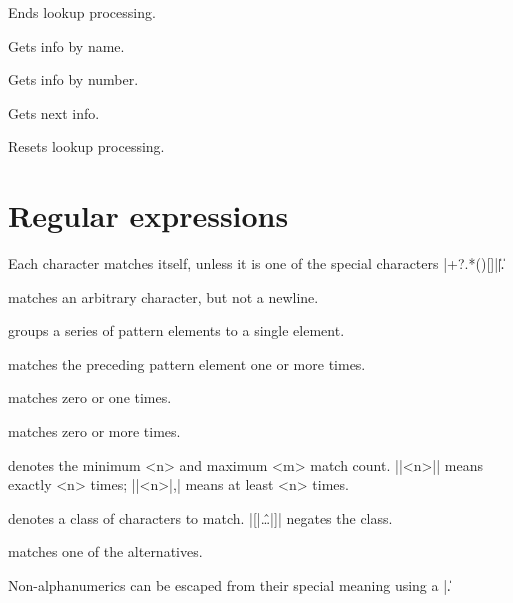 \begin{enum}{6cm}

	Ends lookup processing.

	Gets info by name.

	Gets info by number.

	Gets next info.

	Resets lookup processing.

\end{enum}
\section{Regular expressions} 

Each character matches itself, unless it is one of the special
characters |+?.*()[]{}|\||\|.

\begin{enum}{1cm}

matches an arbitrary character, but not a newline.

\Xj{|(|\ldots|)|}
groups a series of pattern elements to a single element.

\Xj{|+|}
matches the preceding pattern element one or more times.

matches zero or one times.

\Xj{|*|}
matches zero or more times.

denotes the minimum <n> and maximum <m> match count. |{|<n>|}| means
exactly <n> times; |{|<n>|,}| means at least <n> times. 

denotes a class of characters to match. |[|\^\ldots|]| negates the class.

\Xj{|(|\ldots\|\ldots\|\ldots|)|}
matches one of the alternatives.

\end{enum}

Non-alphanumerics can be escaped from their special meaning using a
|\|.

